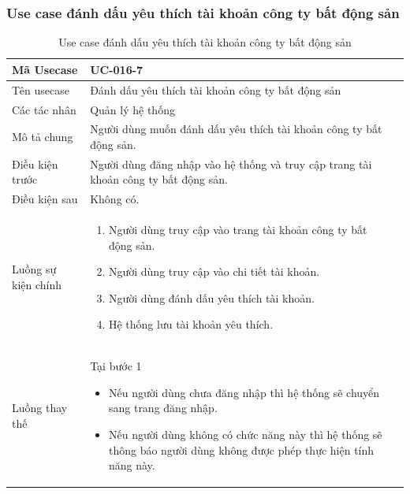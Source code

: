 \documentclass[12pt,a4paper]{article}
\begin{document}
    \subsubsection*{Use case đánh dấu yêu thích tài khoản công ty bất động sản}
    \begin{table}[H]
        \centering
        \begin{tabular}{|p{3.5cm}|p{11.5cm}|c|}
            \hline
            Mã Usecase      & UC-016-7                                                                            \\
            \hline
            Tên usecase     & Đánh dấu yêu thích tài khoản công ty bất động sản                                   \\
            \hline
            Các tác nhân    & Quản lý hệ thống                                                                    \\
            \hline
            Mô tả chung     & Người dùng muốn đánh dấu yêu thích tài khoản công ty bất động sản.                  \\
            \hline

            Điều kiện trước & Người dùng đăng nhập vào hệ thống và truy cập trang tài khoản công ty bất động sản. \\
            \hline

            Điều kiện sau   & Không có.                                                                           \\
            \hline

            Luồng sự kiện chính & \vspace{-.8cm}\begin{enumerate}
                                                    \item Người dùng truy cập vào trang tài khoản công ty bất động sản.
                                                    \item Người dùng truy cập vào chi tiết tài khoản.
                                                    \item Người dùng đánh dấu yêu thích tài khoản.
                                                    \item Hệ thống lưu tài khoản yêu thích.
            \end{enumerate}
            \\
            \hline
            Luồng thay thế & Tại bước 1\newline
            \vspace{-.8cm}\begin{itemize}
                              \item Nếu người dùng chưa đăng nhập thì hệ thống sẽ chuyển sang trang đăng nhập.
                              \item Nếu người dùng không có chức năng này thì hệ thống sẽ thông báo người dùng không được phép thực hiện tính năng này.
            \end{itemize}
            \\ \hline
        \end{tabular}
        \caption{Use case đánh dấu yêu thích tài khoản công ty bất động sản}


\end{table}
\end{document}
